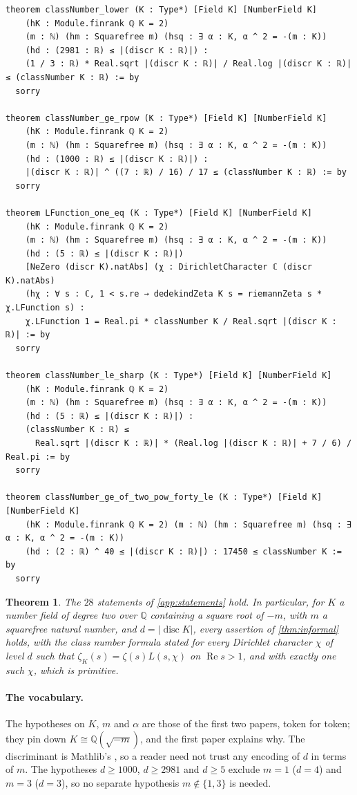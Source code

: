 \documentclass[11pt]{article}
\newtheorem{theorem}{Theorem}[section]
\theoremstyle{definition}
\newcommand{\re}{\operatorname{Re}}
\newcommand{\Q}{\mathbb{Q}}
\newcommand{\disc}{\operatorname{disc}}
\begin{document}
\begin{lstlisting}
theorem classNumber_lower (K : Type*) [Field K] [NumberField K]
    (hK : Module.finrank ℚ K = 2)
    (m : ℕ) (hm : Squarefree m) (hsq : ∃ α : K, α ^ 2 = -(m : K))
    (hd : (2981 : ℝ) ≤ |(discr K : ℝ)|) :
    (1 / 3 : ℝ) * Real.sqrt |(discr K : ℝ)| / Real.log |(discr K : ℝ)| ≤ (classNumber K : ℝ) := by
  sorry

theorem classNumber_ge_rpow (K : Type*) [Field K] [NumberField K]
    (hK : Module.finrank ℚ K = 2)
    (m : ℕ) (hm : Squarefree m) (hsq : ∃ α : K, α ^ 2 = -(m : K))
    (hd : (1000 : ℝ) ≤ |(discr K : ℝ)|) :
    |(discr K : ℝ)| ^ ((7 : ℝ) / 16) / 17 ≤ (classNumber K : ℝ) := by
  sorry

theorem LFunction_one_eq (K : Type*) [Field K] [NumberField K]
    (hK : Module.finrank ℚ K = 2)
    (m : ℕ) (hm : Squarefree m) (hsq : ∃ α : K, α ^ 2 = -(m : K))
    (hd : (5 : ℝ) ≤ |(discr K : ℝ)|)
    [NeZero (discr K).natAbs] (χ : DirichletCharacter ℂ (discr K).natAbs)
    (hχ : ∀ s : ℂ, 1 < s.re → dedekindZeta K s = riemannZeta s * χ.LFunction s) :
    χ.LFunction 1 = Real.pi * classNumber K / Real.sqrt |(discr K : ℝ)| := by
  sorry

theorem classNumber_le_sharp (K : Type*) [Field K] [NumberField K]
    (hK : Module.finrank ℚ K = 2)
    (m : ℕ) (hm : Squarefree m) (hsq : ∃ α : K, α ^ 2 = -(m : K))
    (hd : (5 : ℝ) ≤ |(discr K : ℝ)|) :
    (classNumber K : ℝ) ≤
      Real.sqrt |(discr K : ℝ)| * (Real.log |(discr K : ℝ)| + 7 / 6) / Real.pi := by
  sorry

theorem classNumber_ge_of_two_pow_forty_le (K : Type*) [Field K] [NumberField K]
    (hK : Module.finrank ℚ K = 2) (m : ℕ) (hm : Squarefree m) (hsq : ∃ α : K, α ^ 2 = -(m : K))
    (hd : (2 : ℝ) ^ 40 ≤ |(discr K : ℝ)|) : 17450 ≤ classNumber K := by
  sorry
\end{lstlisting}

\begin{theorem}\label{thm:main}
The $28$ statements of \cref{app:statements} hold. In particular, for $K$ a number field of degree two over $\Q$ containing a square root of $-m$, with $m$ a squarefree natural number, and $d = |\disc K|$, every assertion of \cref{thm:informal} holds, with the class number formula stated for every Dirichlet character $\chi$ of level $d$ such that $\zeta_K(s) = \zeta(s)L(s,\chi)$ on $\re s > 1$, and with exactly one such $\chi$, which is primitive.
\end{theorem}

\paragraph{The vocabulary.} The hypotheses on $K$, $m$ and $\alpha$ are those of the first two papers, token for token; they pin down $K \cong \Q(\sqrt{-m})$, and the first paper explains why. The discriminant is Mathlib's , so a reader need not trust any encoding of $d$ in terms of $m$. The hypotheses $d \ge 1000$, $d \ge 2981$ and $d \ge 5$ exclude $m = 1$ ($d = 4$) and $m = 3$ ($d = 3$), so no separate hypothesis $m \notin \{1, 3\}$ is needed.
\end{document}
